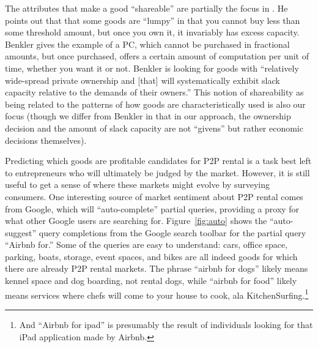 \documentclass[11pt]{article}
\begin{document}
The attributes that make a good ``shareable'' are partially the focus in \cite{benkler2004sharing}.
He points out that that some goods are ``lumpy'' in that you cannot buy less than some threshold amount, but once you own it, it invariably has excess capacity. 
Benkler gives the example of a PC, which cannot be purchased in fractional amounts, but once purchased, offers a certain amount of computation per unit of time, whether you want it or not. 
Benkler is looking for goods with ``relatively wide-spread private ownership and [that] will systematically exhibit slack capacity relative to the demands of their owners.''
This notion of shareability as being related to the patterns of how goods are characteristically used is also our focus (though we differ from Benkler in that in our approach, the ownership decision and the amount of slack capacity are not ``givens'' but rather economic decisions themselves). 

Predicting which goods are profitable candidates for P2P rental is a task best left to entrepreneurs who will ultimately be judged by the market. 
However, it is still useful to get a sense of where these markets might evolve by surveying consumers. 
One interesting source of market sentiment about P2P rental comes from Google, which will ``auto-complete'' partial queries, providing a proxy for what other Google users are searching for. 
Figure~\ref{fig:auto} shows the ``auto-suggest'' query completions from the Google search toolbar for the partial query ``Airbnb for.''
Some of the queries are easy to understand: 
cars, office space, parking, boats, storage, event spaces, and bikes are all indeed goods for which there are already P2P rental markets. 
The phrase ``airbnb for dogs'' likely means kennel space and dog boarding, not rental dogs, while ``airbnb for food'' likely means services where chefs will come to your house to cook, ala KitchenSurfing.\footnote{
  And ``Airbnb for ipad'' is presumably the result of individuals looking for that iPad application made by Airbnb.
}
\end{document}
